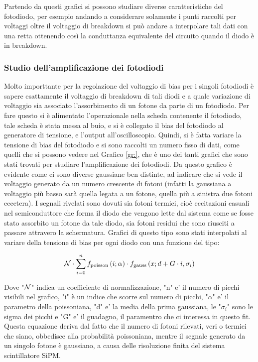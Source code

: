 Partendo da questi grafici si possono studiare diverse caratteristiche del fotodiodo, per esempio andando a considerare solamente i punti raccolti per voltaggi oltre
il voltaggio di breakdown si può andare a interpolare tali dati con una retta ottenendo così la conduttanza equivalente del circuito quando il diodo è in breakdown.


\subsubsection{Studio dell'amplificazione dei fotodiodi}
Molto importtante per la regolazione del voltaggio di bias per i singoli fotodiodi è sapere esattamente il voltaggio di breakdown di tali diodi e a quale variazione di
voltaggio sia associato l'assorbimento di un fotone da parte di un fotodiodo. Per fare questo si è alimentato l'operazionale nella scheda contenente il fotodiodo, tale
scheda è stata messa al buio, e si è collegato il bias del fotodiodo al generatore di tensione, e l'output all'oscilloscopio. Quindi, si è fatta variare la tensione
di bias del fotodiodo e si sono raccolti un numero fisso di dati, come quelli che si possono vedere nel Grafico \ref{gr:}, che è uno dei tanti grafici che sono stati
trovati per studiare l'amplificazione dei fotodiodi. Da questo grafico è evidente come ci sono diverse gaussiane ben distinte, ad indicare che si vede il voltaggio
generato da un numero crescente di fotoni (infatti la gaussiana a voltaggio più basso sarà quella legata a un fotone, quella più a sinistra due fotoni eccetera).
I segnali rivelati sono dovuti sia fotoni termici, cioè eccitazioni casuali nel semiconduttore che forma il diodo che vengono lette dal sistema come se fosse stato assorbito un fotone
da tale diodo, sia fotoni residui che sono riusciti a passare attravero la schermatura. Grafici di questo tipo sono stati interpolati al variare della tensione di bias per ogni diodo con una funzione del tipo:

\begin{equation}
	{\cal N}\cdot\sum_{i=0}^{n}f_{\mathrm{poisson}}\left(i;\alpha\right)\cdot f_{\mathrm{gauss}}\left(x; d + G\cdot i, \sigma_i\right)
	\label{eq:segnale_buio}
\end{equation}

Dove "${\cal N}$" indica un coefficiente di normalizzazione, "n" e' il numero di picchi visibili nel grafico, "i" \`e un indice che scorre sul numero di picchi, "$\alpha$" e' il parametro della poissoniana, "d" e' la media della prima gaussiana, le "$\sigma_i$" sono le sigma dei picchi e "G" e' il guadagno, il paramentro che ci interessa in questo fit. Questa equazione deriva dal fatto che il numero di fotoni rilevati, veri o termici che siano, obbedisce alla probabilit\`a poissoniana, mentre il segnale generato da un singolo fotone \`e gaussiano, a causa delle risoluzione finita del sistema scintillatore SiPM.\\

